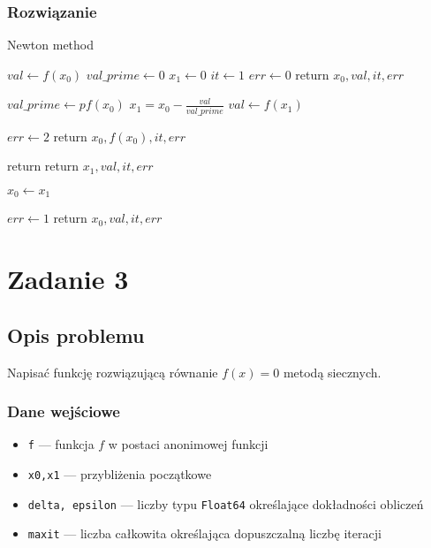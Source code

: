 \documentclass{article}
\begin{document}
\subsubsection*{Rozwiązanie}
	\begin{algorithm}[H]
	\caption{Newton method}
	\begin{algorithmic}
		\State $val \gets f(x_0)$
        \State $val\_prime \gets 0$
        \State $x_1 \gets 0$
        \State $it \gets 1$
        	\State $err \gets 0$
        	\State return $x_0, val, it, err$
        \EndIf

        	\State $val\_prime \gets pf(x_0)$
        	\State $x_1 = x_0 - \frac{val}{val\_prime}$
        	\State $val \gets f(x_1)$

        		\State $err \gets 2$
        		\State return $x_0, f(x_0), it, err$
        	\EndIf

        		\State return return $x_1, val, it, err$
        	\EndIf

        	\State $x_0 \gets x_1$
        \EndFor

        \State $err \gets 1$
        \State return $x_0, val, it, err$
    \end{algorithmic}
    \end{algorithm}
\clearpage

\section*{Zadanie 3}
\subsection*{Opis problemu}
	Napisać funkcję rozwiązującą równanie $f(x) = 0$ metodą siecznych.
\subsubsection*{Dane wejściowe}
	\begin{itemize}
	    \item \texttt{f} — funkcja $f$ w postaci anonimowej funkcji
	    \item \texttt{x0,x1} — przybliżenia początkowe
	    \item \texttt{delta, epsilon} — liczby typu \texttt{Float64} określające dokładności obliczeń
	    \item \texttt{maxit} — liczba całkowita określająca dopuszczalną liczbę iteracji
	\end{itemize}
\end{document}
